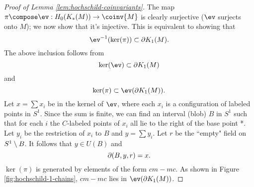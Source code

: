 \begin{proof}[Proof of Lemma \ref{lem:hochschild-coinvariants}]
The map $\pi \compose \ev: H_0(K_*(M)) \to \coinv{M}$ is clearly surjective ($\ev$ surjects onto $M$); we now show that it's injective.
This is equivalent to showing that 
\[
	\ev\inv(\ker(\pi)) \sub \bd K_1(M) .
\]
The above inclusion follows from
\[
	\ker(\ev) \sub \bd K_1(M)
\]
and
\[
	\ker(\pi) \sub \ev(\bd K_1(M)) .
\]
Let $x = \sum x_i$ be in the kernel of $\ev$, where each $x_i$ is a configuration of 
labeled points in $S^1$.
Since the sum is finite, we can find an interval (blob) $B$ in $S^1$
such that for each $i$ the $C$-labeled points of $x_i$ all lie to the right of the 
base point *.
Let $y_i$ be the restriction of $x_i$ to $B$ and $y = \sum y_i$.
Let $r$ be the ``empty" field on $S^1 \setminus B$.
It follows that $y \in U(B)$ and 
\[
	\partial(B, y, r) = x .
\]
$\ker(\pi)$ is generated by elements of the form $cm - mc$.
As shown in Figure \ref{fig:hochschild-1-chains}, $cm - mc$ lies in $\ev(\bd K_1(M))$.
\end{proof}

